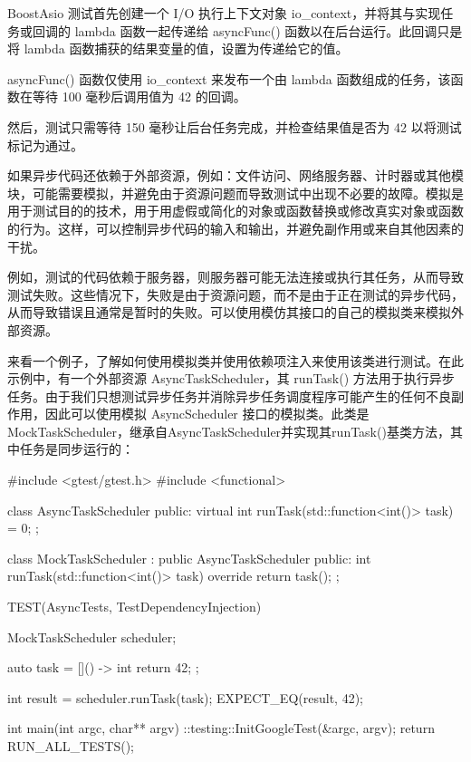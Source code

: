 BoostAsio 测试首先创建一个 I/O 执行上下文对象 io\_context，并将其与实现任务或回调的 lambda 函数一起传递给 asyncFunc() 函数以在后台运行。此回调只是将 lambda 函数捕获的结果变量的值，设置为传递给它的值。

asyncFunc() 函数仅使用 io\_context 来发布一个由 lambda 函数组成的任务，该函数在等待 100 毫秒后调用值为 42 的回调。

然后，测试只需等待 150 毫秒让后台任务完成，并检查结果值是否为 42 以将测试标记为通过。


如果异步代码还依赖于外部资源，例如：文件访问、网络服务器、计时器或其他模块，可能需要模拟，并避免由于资源问题而导致测试中出现不必要的故障。模拟是用于测试目的的技术，用于用虚假或简化的对象或函数替换或修改真实对象或函数的行为。这样，可以控制异步代码的输入和输出，并避免副作用或来自其他因素的干扰。

例如，测试的代码依赖于服务器，则服务器可能无法连接或执行其任务，从而导致测试失败。这些情况下，失败是由于资源问题，而不是由于正在测试的异步代码，从而导致错误且通常是暂时的失败。可以使用模仿其接口的自己的模拟类来模拟外部资源。

来看一个例子，了解如何使用模拟类并使用依赖项注入来使用该类进行测试。在此示例中，有一个外部资源 AsyncTaskScheduler，其 runTask() 方法用于执行异步任务。由于我们只想测试异步任务并消除异步任务调度程序可能产生的任何不良副作用，因此可以使用模拟 AsyncScheduler 接口的模拟类。此类是 MockTaskScheduler，继承自AsyncTaskScheduler并实现其runTask()基类方法，其中任务是同步运行的：

\begin{cpp}
#include <gtest/gtest.h>
#include <functional>

class AsyncTaskScheduler {
    public:
    virtual int runTask(std::function<int()> task) = 0;
};

class MockTaskScheduler : public AsyncTaskScheduler {
    public:
    int runTask(std::function<int()> task) override {
        return task();
    }
};

TEST(AsyncTests, TestDependencyInjection) {
    MockTaskScheduler scheduler;

    auto task = []() -> int {
        return 42;
    };

    int result = scheduler.runTask(task);
    EXPECT_EQ(result, 42);
}

int main(int argc, char** argv) {
    ::testing::InitGoogleTest(&argc, argv);
    return RUN_ALL_TESTS();
}
\end{cpp}

